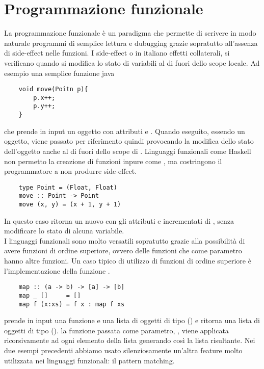 \section{Programmazione funzionale}
    La programmazione funzionale è un paradigma che permette di scrivere in modo naturale programmi di semplice lettura e dubugging grazie sopratutto all'assenza di side-effect nelle funzioni.
    I side-effect o in italiano effetti collaterali, si verificano quando si modifica lo stato di variabili al di fuori dello scope locale. Ad esempio una semplice funzione java
    \begin{verbatim}
    void move(Poitn p){
        p.x++;
        p.y++;
    }
    \end{verbatim} 
    che prende in input un oggetto  con attributi  e . Quando eseguito, essendo  un oggetto, viene passato per riferimento
    quindi provocando la modifica dello stato dell'oggetto anche al di fuori dello scope di . Linguaggi funzionali come Haskell non
    permetto la creazione di funzioni inpure come , ma costringono il programmatore a non produrre side-effect.
    \begin{verbatim}
    type Point = (Float, Float)
    move :: Point -> Point
    move (x, y) = (x + 1, y + 1)
    \end{verbatim}
    In questo caso  ritorna un nuovo  con gli attributi  e  incrementati di , senza modificare lo stato di alcuna
    variabile.
    \\I linguaggi funzionali sono molto versatili sopratutto grazie alla possibilità di avere funzioni di ordine superiore, ovvero delle funzioni che come parametro
    hanno altre funzioni. Un caso tipico di utilizzo di funzioni di ordine superiore è l'implementazione della funzione .
    \begin{verbatim}
    map :: (a -> b) -> [a] -> [b]
    map _ []     = []
    map f (x:xs) = f x : map f xs
    \end{verbatim}
     prende in input una funzione  e una lista di oggetti di tipo  (\code{[a]}) e ritorna una lista di oggetti di tipo  (\code{[b]}). 
    la funzione passata come parametro, , viene applicata ricorsivamente ad ogni elemento della lista  generando così la lista risultante. 
    Nei due esempi precedenti abbiamo usato silenziosamente un'altra feature molto utilizzata nei linguaggi funzionali: il pattern matching.

